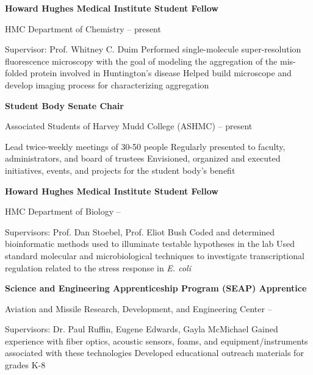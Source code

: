 \documentclass[letterpaper,10pt,oneside]{article}
\begin{document}
\begin{body}
\BigGap

{\textbf{Howard Hughes Medical Institute Student Fellow}}

\GapNoBreak
\BulletItem
HMC Department of Chemistry
\hfill
{} --
present
\begin{detail}
\SubBulletItem
Supervisor:
Prof. Whitney C. Duim
\SubBulletItemBullet
Performed single-molecule super-resolution fluorescence microscopy with the goal of modeling the aggregation of the mis-folded protein involved in	Huntington's disease
\SubBulletItemBullet
Helped build microscope and develop imaging process for 			characterizing aggregation
\end{detail}

\BigGap

{\textbf{Student Body Senate Chair}}

\GapNoBreak
\BulletItem
Associated Students of Harvey Mudd College (ASHMC)
\hfill
{} --
present
\begin{detail}
\SubBulletItemBullet
Lead twice-weekly meetings of 30-50 people
\SubBulletItemBullet
Regularly presented to faculty, administrators, and board of trustees
\SubBulletItemBullet
Envisioned, organized and executed initiatives, events, and projects for the student body's benefit
\end{detail}

\BigGap

{\textbf{Howard Hughes Medical Institute Student Fellow}}

\GapNoBreak
\BulletItem
HMC Department of Biology
\hfill
{} --
\begin{detail}
\SubBulletItem
Supervisors:
Prof. Dan Stoebel, Prof. Eliot Bush
\SubBulletItemBullet
Coded and determined bioinformatic methods used to illuminate testable hypotheses in the  lab
\SubBulletItemBullet
Used standard molecular and microbiological techniques to investigate transcriptional regulation related to the stress response in {\it E. coli}
\end{detail}

\BigGap

{\textbf{Science and Engineering Apprenticeship Program (SEAP) Apprentice}}

\GapNoBreak
\BulletItem
Aviation and Missile Research, Development, and Engineering Center \hfill
{} --
\begin{detail}
\SubBulletItem
Supervisors:
Dr. Paul Ruffin, Eugene Edwards, Gayla McMichael
\SubBulletItemBullet
Gained experience with fiber optics, acoustic sensors, foams, and equipment/instruments associated with these technologies
\SubBulletItemBullet
Developed educational outreach materials for grades K-8
\end{detail}


\end{body}
\end{document}
